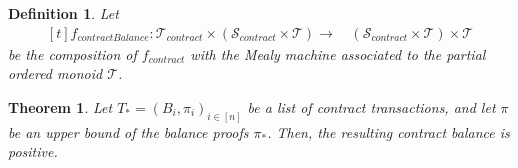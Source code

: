 \documentclass[runningheads]{llncs}
\newtheorem{defn}{Definition}
\newtheorem{thm}{Theorem}
\newcommand{\T}{\mathcal{T}}
\renewcommand{\S}{\mathcal{S}}
\begin{document}
\begin{defn}
  Let
  \[
    \begin{aligned}[t]
      f_{contractBalance} \colon \T_{contract} \times (\S_{contract}
      \times \T) \to
      &\, (\S_{contract} \times \T) \times \T
    \end{aligned}
  \]
  be the composition of \(f_{contract}\) with the Mealy machine
  associated to the partial ordered monoid \(\T\).

\end{defn}

\begin{thm}
  Let \(T_* = (B_i,\pi_i)_{i \in [n]}\) be a list of contract
  transactions, and let \(\pi\) be an upper bound of the balance proofs
  \(\pi_*\). Then, the resulting contract balance is positive.
\end{thm}


\end{document}
